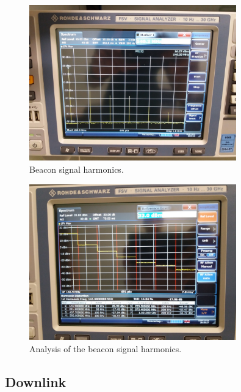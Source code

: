 \begin{figure}[H]
    \begin{center}
        \includegraphics[width=0.8\textwidth]{figures/tests/beacon_harmonics.jpg}
        \caption{Beacon signal harmonics.}
        \label{fig:beacon-harmonics}
    \end{center}
\end{figure}

\begin{figure}[H]
    \begin{center}
        \includegraphics[width=0.8\textwidth]{figures/tests/beacon_harmonics_analysis.jpg}
        \caption{Analysis of the beacon signal harmonics.}
        \label{fig:beacon-harmonics-analysis}
    \end{center}
\end{figure}

\subsection{Downlink}

